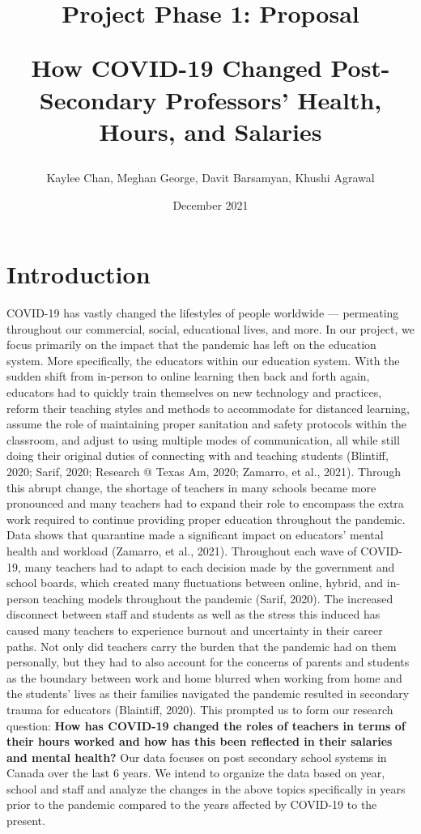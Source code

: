\documentclass{article}
\title{Project Phase 1: Proposal

How COVID-19 Changed Post-Secondary Professors' Health, Hours, and Salaries}
\author{Kaylee Chan, Meghan George, Davit Barsamyan, Khushi Agrawal}
\date{December 2021}
\begin{document}
\maketitle

\section{Introduction}
COVID-19 has vastly changed the lifestyles of people worldwide --- permeating throughout our commercial, social, educational lives, and more. In our project, we focus primarily on the impact that the pandemic has left on the education system. More specifically, the educators within our education system. With the sudden shift from in-person to online learning then back and forth again, educators had to quickly train themselves on new technology and practices, reform their teaching styles and methods to accommodate for distanced learning, assume the role of maintaining proper sanitation and safety protocols within the classroom, and adjust to using multiple modes of communication, all while still doing their original duties of connecting with and teaching students (Blintiff, 2020; Sarif, 2020; Research @ Texas Am, 2020; Zamarro, et al., 2021). Through this abrupt change, the shortage of teachers in many schools became more pronounced and many teachers had to expand their role to encompass the extra work required to continue providing proper education throughout the pandemic. Data shows that quarantine made a significant impact on educators' mental health and workload (Zamarro, et al., 2021). Throughout each wave of COVID-19, many teachers had to adapt to each decision made by the government and school boards, which created many fluctuations between online, hybrid, and in-person teaching models throughout the pandemic (Sarif, 2020). The increased disconnect between staff and students as well as the stress this induced has caused many teachers to experience burnout and uncertainty in their career paths. Not only did teachers carry the burden that the pandemic had on them personally, but they had to also account for the concerns of parents and students as the boundary between work and home blurred when working from home and the students' lives as their families navigated the pandemic resulted in secondary trauma for educators (Blaintiff, 2020). This prompted us to form our research question: \textbf{How has COVID-19 changed the roles of teachers in terms of their hours worked and how has this been reflected in their salaries and mental health?} Our data focuses on post secondary school systems in Canada over the last 6 years. We intend to organize the data based on year, school and staff and analyze the changes in the above topics specifically in years prior to the pandemic compared to the years affected by COVID-19 to the present.
\end{document}
